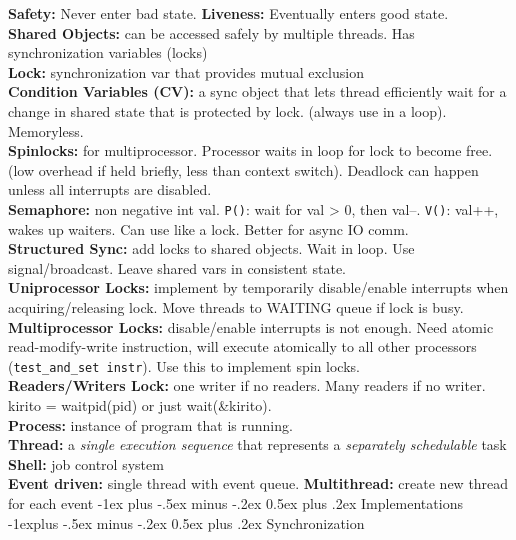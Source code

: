 \documentclass[8pt,landscape]{article}
\makeatletter
\renewcommand{\section}{\@startsection{section}{1}{0mm}%
                                {-1ex plus -.5ex minus -.2ex}%
                                {0.5ex plus .2ex}%
                                {\normalfont\large\bfseries}}
\renewcommand{\subsection}{\@startsection{subsection}{2}{0mm}%
                                {-1explus -.5ex minus -.2ex}%
                                {0.5ex plus .2ex}%
                                {\normalfont\normalsize\bfseries}}
\makeatother
\begin{document}
\begin{multicols}{3}
\begin{enumerate}
\end{enumerate}
\textbf{Safety:} Never enter bad state. \textbf{Liveness:} Eventually enters good state.\\ 
\textbf{Shared Objects:} can be accessed safely by multiple threads. Has synchronization variables (locks) \\ 
\textbf{Lock:} synchronization var that provides mutual exclusion \\
\textbf{Condition Variables (CV):} a sync object that lets thread efficiently wait for a change in shared state that is protected by lock. (always use in a loop). Memoryless.\\ 
\textbf{Spinlocks:} for multiprocessor. Processor waits in loop for lock to become free. (low overhead if held briefly, less than context switch). Deadlock can happen unless all interrupts are disabled. \\
\textbf{Semaphore:} non negative int val. {\tt P()}: wait for val > 0, then val--. {\tt V()}: val++, wakes up waiters. Can use like a lock. Better for async IO comm.\\ 
\textbf{Structured Sync:} add locks to shared objects. Wait in loop. Use signal/broadcast. Leave shared vars in consistent state.\\
\textbf{Uniprocessor Locks:} implement by temporarily disable/enable interrupts when acquiring/releasing lock. Move threads to WAITING queue if lock is busy. \\
\textbf{Multiprocessor Locks:} disable/enable interrupts is not enough. Need atomic read-modify-write instruction, will execute atomically to all other processors ({\tt test\_and\_set instr}). Use this to implement spin locks.\\
\textbf{Readers/Writers Lock:} one writer if no readers. Many readers if no writer. kirito = waitpid(pid) or just wait(\&kirito).\\ 
\textbf{Process:} instance of program that is running. \\
\textbf{Thread:} a {\it single execution sequence} that represents a {\it separately schedulable} task\\ 
\textbf{Shell:} job control system\\
\textbf{Event driven:} single thread with event queue. \textbf{Multithread:} create new thread for each event
\section{Implementations}
\subsection{Synchronization}

\end{multicols}
\end{document}
